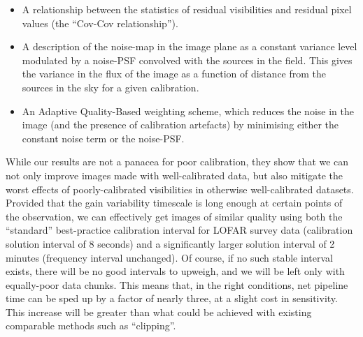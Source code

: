 \begin{itemize}
\item A relationship between the statistics of residual visibilities and residual pixel values (the ``Cov-Cov relationship'').
\item A description of the noise-map in the image plane {as a constant variance level modulated by a noise-PSF convolved with the sources in the field. This gives }the variance in the flux of the image as a function of distance from the sources in the sky for a given calibration.
\item {An Adaptive Quality-Based weighting scheme, which reduces the noise in the image (and the presence of calibration artefacts) by minimising either the constant noise term or the noise-PSF.} 
\end{itemize}

\pg
{While our results are not a panacea for poor calibration, they show that we can not only improve images made with well-calibrated data, but also mitigate the worst effects of poorly-calibrated visibilities in otherwise well-calibrated datasets. Provided that the gain variability timescale is long enough at certain points of the observation, we can effectively get images of similar quality using both the} ``standard'' best-practice calibration interval for LOFAR survey data (calibration solution interval of 8 seconds) and a significantly larger solution interval of 2 minutes (frequency interval unchanged). {Of course, if no such stable interval exists, there will be no good intervals to upweigh, and we will be left only with equally-poor data chunks.} This means that{, in the right conditions,} net pipeline time {can be} sped up by a factor of nearly three, at a slight cost in sensitivity. {This increase will be greater than what could be achieved with existing comparable methods such as ``clipping''.}

